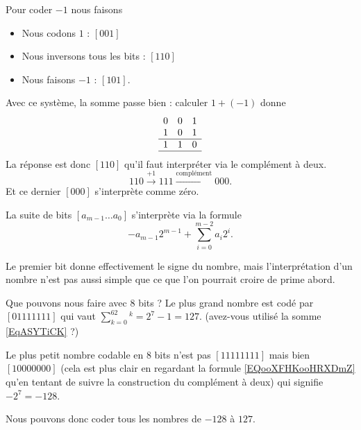\begin{example}
    Pour coder \( -1\) nous faisons
    \begin{itemize}
        \item Nous codons \( 1\) : \( [001]\)
        \item Nous inversons tous les bits : \( [110]\)
        \item Nous faisons \( -1\) : \( [101]\).
    \end{itemize}
\end{example}

Avec ce système, la somme passe bien : calculer \( 1+(-1)\) donne
    \begin{equation*}
        \begin{array}[]{ccc}
            0&0&1\\
            1&0&1\\
            \hline
            1&1&0\\
            \hline
        \end{array}
    \end{equation*}
La réponse est donc \( [110]\) qu'il faut interpréter via le complément à deux. 
\begin{equation}
    110\stackrel{+1}{\longrightarrow}111\stackrel{\text{complément}}{\longrightarrow}000.
\end{equation}
Et ce dernier \( [000]\) s'interprète comme zéro.

\begin{definition}
    La suite de bits \( [a_{m-1}\ldots a_0]\) s'interprète via la formule
    \begin{equation}        \label{EQooXFHKooHRXDmZ}
        -a_{m-1}2^{m-1}+\sum_{i=0}^{m-2}a_i2^i.
    \end{equation}
\end{definition}

Le premier bit donne effectivement le signe du nombre, mais l'interprétation d'un nombre n'est pas aussi simple que ce que l'on pourrait croire de prime abord.

\begin{example}
    Que pouvons nous faire avec \( 8\) bits ? Le plus grand nombre est codé par \( [01111111]\) qui vaut \( \sum_{k=0}^62^k=2^7-1=127\). (avez-vous utilisé la somme \eqref{EqASYTiCK} ?)

    Le plus petit nombre codable en \( 8\) bits n'est pas \( [11111111]\) mais bien \( [10000000]\) (cela est plus clair en regardant la formule \eqref{EQooXFHKooHRXDmZ} qu'en tentant de suivre la construction du complément à deux) qui signifie \( -2^7=-128\).

    Nous pouvons donc coder tous les nombres de \( -128\) à \( 127\).
\end{example}

